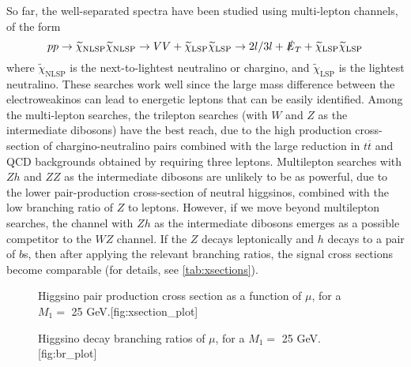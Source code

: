 So far, the well-separated spectra have been studied using multi-lepton channels, of the form 
\[pp\rightarrow \widetilde{\chi}_\text{NLSP}\widetilde{\chi}_\text{NLSP}\rightarrow VV + \widetilde{\chi}_\text{LSP}\widetilde{\chi}_\text{LSP}\rightarrow 2l/3l + \slashed{E}_T +  \widetilde{\chi}_\text{LSP}\widetilde{\chi}_\text{LSP}\]
where $\widetilde{\chi}_\text{NLSP}$ is the next-to-lightest neutralino or chargino, and $\widetilde{\chi}_\text{LSP}$ is the lightest neutralino. These searches work well since the large mass difference between the electroweakinos can lead to energetic leptons that can be easily identified. Among the multi-lepton searches, the trilepton searches (with $W$ and $Z$ as the intermediate dibosons) have the best reach, due to the high production cross-section of chargino-neutralino pairs combined with the large reduction in $t\overline{t}$ and QCD backgrounds obtained by requiring three leptons. Multilepton searches with $Zh$ and $ZZ$ as the intermediate dibosons are unlikely to be as powerful, due to the lower pair-production cross-section of neutral higgsinos, combined with the low branching ratio of $Z$ to leptons. However, if we move beyond multilepton searches, the channel with $Zh$ as the intermediate dibosons emerges as a possible competitor to the $WZ$ channel. If the $Z$ decays leptonically and $h$ decays to a pair of $b$s, then after applying the relevant branching ratios, the signal cross sections become comparable (for details, see \autoref{tab:xsections}). 
\begin{figure}
    \centering
    \begin{sidecaption}{Higgsino pair production cross section as a function of $\mu$, for a $M_1=$ 25 GeV.}[fig:xsection_plot]

\end{sidecaption}
\end{figure}
\begin{figure}
    \centering
    \begin{sidecaption}{Higgsino decay branching ratios of $\mu$, for a $M_1=$ 25 GeV.}[fig:br_plot]

\end{sidecaption}
\end{figure}


